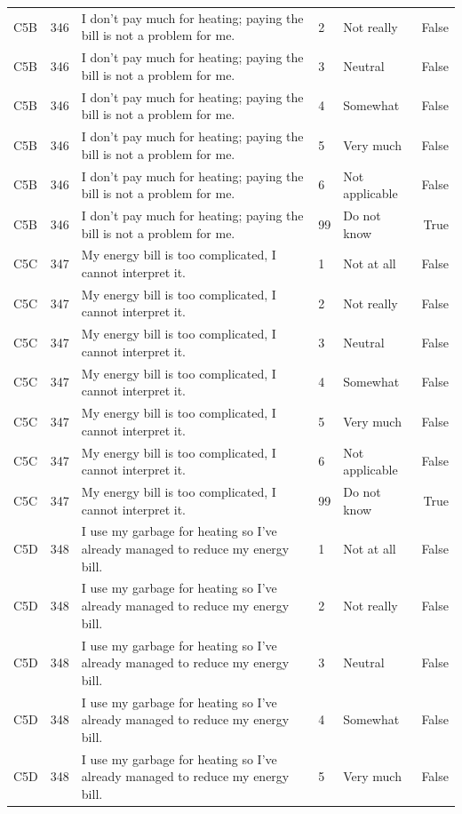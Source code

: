 \begin{tabular}{lrlllr}
C5B & 346 & I don’t pay much for heating; paying the bill is not a problem for me. & 2 & Not really & False \\
C5B & 346 & I don’t pay much for heating; paying the bill is not a problem for me. & 3 & Neutral & False \\
C5B & 346 & I don’t pay much for heating; paying the bill is not a problem for me. & 4 & Somewhat & False \\
C5B & 346 & I don’t pay much for heating; paying the bill is not a problem for me. & 5 & Very much & False \\
C5B & 346 & I don’t pay much for heating; paying the bill is not a problem for me. & 6 & Not applicable & False \\
C5B & 346 & I don’t pay much for heating; paying the bill is not a problem for me. & 99 & Do not know & True \\
C5C & 347 & My energy bill is too complicated, I cannot interpret it. & 1 & Not at all & False \\
C5C & 347 & My energy bill is too complicated, I cannot interpret it. & 2 & Not really & False \\
C5C & 347 & My energy bill is too complicated, I cannot interpret it. & 3 & Neutral & False \\
C5C & 347 & My energy bill is too complicated, I cannot interpret it. & 4 & Somewhat & False \\
C5C & 347 & My energy bill is too complicated, I cannot interpret it. & 5 & Very much & False \\
C5C & 347 & My energy bill is too complicated, I cannot interpret it. & 6 & Not applicable & False \\
C5C & 347 & My energy bill is too complicated, I cannot interpret it. & 99 & Do not know & True \\
C5D & 348 & I use my garbage for heating so I’ve already managed to reduce my energy bill. & 1 & Not at all & False \\
C5D & 348 & I use my garbage for heating so I’ve already managed to reduce my energy bill. & 2 & Not really & False \\
C5D & 348 & I use my garbage for heating so I’ve already managed to reduce my energy bill. & 3 & Neutral & False \\
C5D & 348 & I use my garbage for heating so I’ve already managed to reduce my energy bill. & 4 & Somewhat & False \\
C5D & 348 & I use my garbage for heating so I’ve already managed to reduce my energy bill. & 5 & Very much & False \\

\end{tabular}
